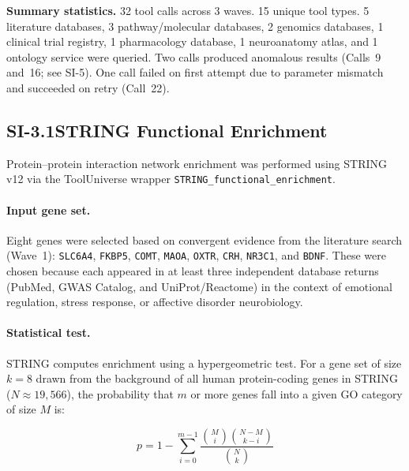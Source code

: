 \noindent
\textbf{Summary statistics.}
32 tool calls across 3 waves.  15 unique tool types.  5 literature databases,
3 pathway/molecular databases, 2 genomics databases, 1 clinical trial
registry, 1 pharmacology database, 1 neuroanatomy atlas, and 1 ontology
service were queried.  Two calls produced anomalous results (Calls~9 and~16;
see SI-5).  One call failed on first attempt due to parameter mismatch and
succeeded on retry (Call~22).


\subsection*{SI-3.1\quad STRING Functional Enrichment}

Protein--protein interaction network enrichment was performed using STRING
v12 \cite{szklarczyk2023string} via the ToolUniverse wrapper
\texttt{STRING\_functional\_enrichment}.

\paragraph{Input gene set.}
Eight genes were selected based on convergent evidence from the literature
search (Wave~1): \texttt{SLC6A4}, \texttt{FKBP5}, \texttt{COMT},
\texttt{MAOA}, \texttt{OXTR}, \texttt{CRH}, \texttt{NR3C1}, and
\texttt{BDNF}.  These were chosen because each appeared in at least three
independent database returns (PubMed, GWAS Catalog, and UniProt/Reactome)
in the context of emotional regulation, stress response, or affective
disorder neurobiology.

\paragraph{Statistical test.}
STRING computes enrichment using a hypergeometric test.  For a gene set of
size $k = 8$ drawn from the background of all human protein-coding genes
in STRING ($N \approx 19{,}566$), the probability that $m$ or more genes
fall into a given GO category of size $M$ is:

\begin{equation}
  p = 1 - \sum_{i=0}^{m-1} \frac{\binom{M}{i}\binom{N-M}{k-i}}{\binom{N}{k}}
\end{equation}

